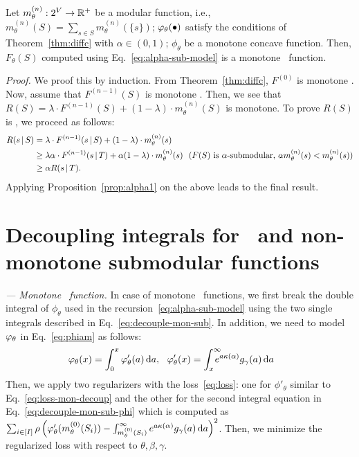 \documentclass{article}
\newcommand{\ehdr}[1]{\noindent\emph{#1.}}
\def\d{\mathrm{d}}
\newcommand{\ga}{\kappa(\alpha)}
\begin{document}
\begin{proposition}
\label{prop:neural-alpha}
Let  $m^{(n)} _{\theta} : 2^V \to \mathbb{R}^+ $ be a modular function, i.e.,  $m^{(n)}  _{\theta} (S) = \sum_{s\in S}m^{(n)} _{\theta}(\{s\})$; $\varphi_{\theta}(\bullet)$ satisfy the conditions of Theorem~\ref{thm:diffc} with $\alpha\in(0,1)$; $\phi_{\theta}$ be a monotone concave function. Then, $F_{\theta}(S)$ computed using Eq.~\eqref{eq:alpha-sub-model} is a monotone \asb\ function. 
\end{proposition}

\ehdr{Proof} We proof this by induction. From  Theorem~\ref{thm:diffc}, $F^{(0)}$ is monotone \asb. Now, assume that $F^{(n-1)}(S)$ is monotone \asb.
 Then, we see that $R(S) = \lambda \cdot F^{(n-1)}(S)  + (1-\lambda)\cdot m_{\theta} ^{(n)} (S)$ is monotone. To prove $R(S)$ is \asb, we proceed as follows: 
 \begin{align}
  R(s\,|\, S) & = \lambda \cdot F^{(n-1)}(s\,|\, S)  + (1-\lambda)\cdot m_{\theta} ^{(n)} ({s})\nonumber\\
  & \ge \lambda \alpha \cdot F^{(n-1)}(s\,|\, T)  + \alpha (1-\lambda)\cdot m_{\theta} ^{(n)} ({s}) \  \text{ ($F(S)$ is $\alpha$-submodular, $\alpha  m_{\theta} ^{(n)} ({s}) <  m_{\theta} ^{(n)} ({s})$)}\nonumber\\
 & \ge \alpha R(s\,|\, T).
 \end{align}
Applying Proposition~\ref{prop:alpha1} on the above leads to the final result. 

\section{Decoupling integrals for \asb\ and non-monotone submodular functions}
\label{app:decoupling}
\emph{--- Monotone \asb\ function.} In case of monotone \asb\ functions, we first break the double integral of $\phi_{\theta}$ used in the recursion~\eqref{eq:alpha-sub-model} using the two single integrals described in Eq.~\eqref{eq:decouple-mon-sub}. In addition, we  
need to model $\varphi_{\theta}$ in Eq.~\eqref{eq:phiam} as follows:
\begin{align}
   \hspace{-3mm} \diffc_{\theta}(x) & = \int_{0} ^{x} \diffc' _{\theta}(a) \, \d a,  \ \
     \diffc' _{\theta}(x) = \int_{x} ^{\infty} \hspace{-3mm} e^{a\ga} g_{\gamma}(a) \, \d a \label{eq:decouple-mon-sub-phi}
\end{align}
Then, we apply two regularizers with the loss~\eqref{eq:loss}: one for $\phi' _{\theta}$ similar to Eq.~\eqref{eq:loss-mon-decoup} and the other for the second integral equation in Eq.~\eqref{eq:decouple-mon-sub-phi} which is computed as
$\sum_{i \in [I]}\rho\left(\diffc' _{\theta}(m_{\theta} ^{(0)} (S_i)) -\int_{m_{\theta} ^{(0)}(S_i)} ^{\infty}  e^{a\ga} g_{\gamma}(a) \, \d a \right)^2$.
Then, we minimize the regularized loss with respect to $\theta,\beta, \gamma$. 
 
\end{document}
